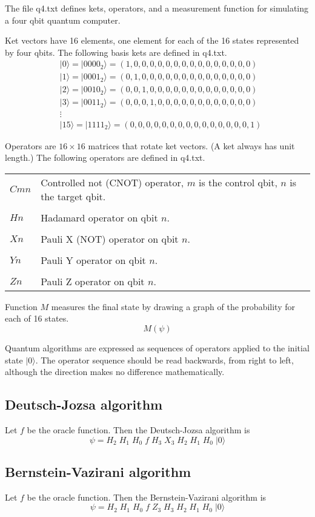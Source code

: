 \documentclass[12pt]{article}
\begin{document}
\noindent
The file q4.txt defines kets, operators, and a measurement function
for simulating a four qbit quantum computer.

\bigskip
\noindent
Ket vectors have 16 elements, one element for each of the 16 states represented by four qbits.
The following basis kets are defined in q4.txt.
\begin{align*}
&|0\rangle=|0000_2\rangle=(1,0,0,0,0,0,0,0,0,0,0,0,0,0,0,0)
\\
&|1\rangle=|0001_2\rangle=(0,1,0,0,0,0,0,0,0,0,0,0,0,0,0,0)
\\
&|2\rangle=|0010_2\rangle=(0,0,1,0,0,0,0,0,0,0,0,0,0,0,0,0)
\\
&|3\rangle=|0011_2\rangle=(0,0,0,1,0,0,0,0,0,0,0,0,0,0,0,0)
\\
&\vdots
\\
&|15\rangle=|1111_2\rangle=(0,0,0,0,0,0,0,0,0,0,0,0,0,0,0,1)
\end{align*}

\noindent
Operators are $16\times16$ matrices that rotate ket vectors.
(A ket always has unit length.)
The following operators are defined in q4.txt.

\bigskip
\begin{tabular}{l l}
$Cmn$ & Controlled not (CNOT) operator, $m$ is the control qbit, $n$ is the target qbit.
\\
\\
$Hn$ & Hadamard operator on qbit $n$.
\\
\\
$Xn$ & Pauli X (NOT) operator on qbit $n$.
\\
\\
$Yn$ & Pauli Y operator on qbit $n$.
\\
\\
$Zn$ & Pauli Z operator on qbit $n$.
\end{tabular}

\bigskip
\noindent
Function $M$ measures the final state by drawing a graph of the probability
for each of 16 states.
\begin{equation*}
M(\psi)
\end{equation*}

\noindent
Quantum algorithms are expressed as sequences of operators applied
to the initial state $|0\rangle$.
The operator sequence should be read backwards, from right to left,
although the direction makes no difference mathematically.

\subsection*{Deutsch-Jozsa algorithm}
Let $f$ be the oracle function.
Then the Deutsch-Jozsa algorithm is
\begin{equation*}
\psi = H_2 \; H_1 \; H_0 \; f \; H_3 \; X_3 \; H_2 \; H_1 \; H_0 \; |0\rangle
\end{equation*}

\subsection*{Bernstein-Vazirani algorithm}
Let $f$ be the oracle function.
Then the Bernstein-Vazirani algorithm is
\begin{equation*}
\psi = H_2 \; H_1 \; H_0 \; f \; Z_3 \; H_3 \; H_2 \; H_1 \; H_0 \; |0\rangle
\end{equation*}
\end{document}
